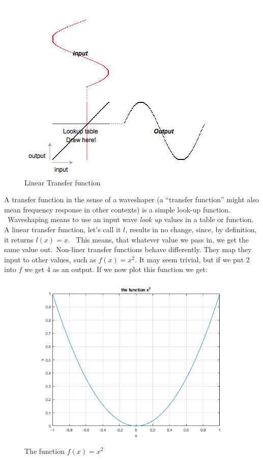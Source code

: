 \begin{figure}[H]
	\begin{center}
		\includegraphics[scale = 1]{img/waveShapingVisual.png}
		\caption{Linear Transfer function}
		\label{fig:linfunct}
	\end{center}
\end{figure}
A transfer function in the sense of a waveshaper (a ``transfer function'' might also mean frequency response in other contexts) is a simple look-up function. \
Waveshaping means to use an input wave \textit{look up} values in a table or function. A linear transfer function, let's call it $l$, results in no change, since, by definition, it returns $l(x)=x$. \
This means, that whatever value we pass in, we get the same value out.\
Non-liner transfer functions behave differently. They map they input to other values, such as $f(x) = x^2$. It may seem trivial, but if we put 2 into $f$ we get 4 as an output. If we now plot this function we get:

\begin{figure}[H]
	\begin{center}
		\includegraphics[width = 14cm]{img/squareFunction.png}
		\caption{The function $f(x)=x^2$}
		\label{fig:square}
	\end{center}
\end{figure}

